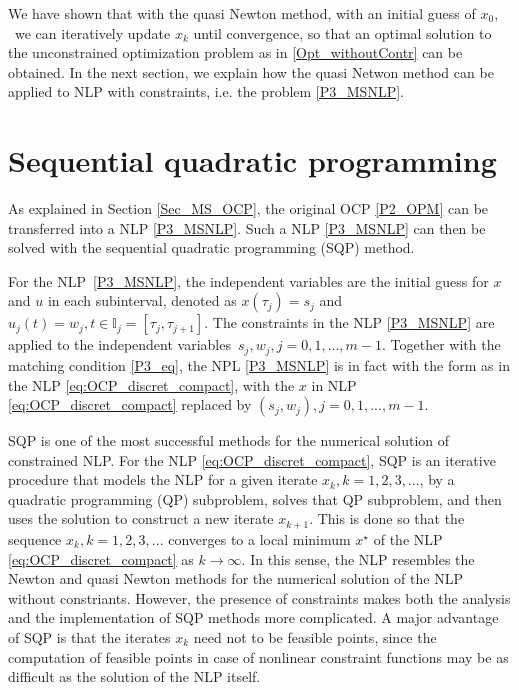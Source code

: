 \documentclass  [
  paper    = a4,
  BCOR     = 10mm,
  twoside,
  fontsize = 12pt,
  fleqn,
  toc      = bibnumbered,
  toc      = listofnumbered,
  numbers  = noendperiod,
  headings = normal,
  listof   = leveldown,
  version  = 3.03
]                                       {scrreprt}
\newcommand{\<}{\langle}
\renewcommand{\>}{\rangle}
\begin{document}
We have shown that with the quasi Newton method, with an initial guess of $x_0$,  we can iteratively update $x_k$ until convergence, so that an optimal solution to the unconstrained optimization problem as in \ref{Opt_withoutContr} can be obtained. In the next section, we explain how the quasi Netwon method can be applied to NLP with constraints, i.e. the problem \ref{P3_MSNLP}.



\section{Sequential quadratic programming}
As explained in Section \ref{Sec_MS_OCP}, the original OCP \ref{P2_OPM} can be transferred into a NLP \ref{P3_MSNLP}. Such a NLP \ref{P3_MSNLP} can then be solved with the sequential quadratic programming (SQP) method. 


For the NLP \ref{P3_MSNLP}, the independent variables are the initial guess
for $x$ and $u$ in each subinterval, denoted as $x(\tau_j) = s_j$ and $u_j(t) = w_j, t \in \mathbb{I}_j = [\tau_j, \tau_{j+1}]$. The constraints in the NLP \ref{P3_MSNLP} are applied to the independent variables $s_j, w_j, j =0, 1, ..., m-1$. Together with the matching condition \ref{P3_eq}, the NPL \ref{P3_MSNLP} is in fact with the form as in the NLP \ref{eq:OCP_discret_compact}, with the $x$ in NLP \ref{eq:OCP_discret_compact} replaced by $(s_j, w_j), j =0, 1, ..., m-1$.

SQP is one of the most successful methods for the numerical solution of constrained NLP. For the NLP \ref{eq:OCP_discret_compact}, SQP is an iterative procedure that models the NLP for a given iterate $x_k, k =1, 2, 3, ...$, by a quadratic programming (QP) subproblem, solves that QP subproblem, and then uses the solution to construct a new iterate $x_{k+1}$. This is done so that the sequence $x_k, k =1, 2, 3,...$ converges to a local minimum $x^\star$ of the NLP  \ref{eq:OCP_discret_compact} as $k \rightarrow \infty$. In this sense, the NLP resembles the Newton and quasi Newton methods for the numerical solution of the NLP without constriants. However, the presence of constraints makes both the analysis and the implementation of SQP methods more complicated. A major advantage of SQP is that the iterates $x_k$ need not to be feasible points, since the computation of feasible points in case of nonlinear constraint functions may be as difficult as the solution of the NLP itself.
\end{document}
